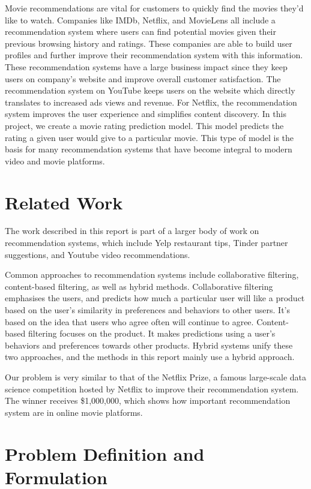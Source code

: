 \documentclass{sig-alternate-05-2015}
\begin{document}
Movie recommendations are vital for customers to quickly find the movies they'd like to watch. Companies
like IMDb, Netflix, and MovieLens all include a recommendation system where users can find potential
movies given their previous browsing history and ratings. These companies are able to build user
profiles and further improve their recommendation system with this information. These recommendation
systems have a large business impact since they keep users on company's website and improve overall
customer satisfaction. The recommendation system on YouTube keeps users on the website
which directly translates to increased ads views and revenue. For Netflix, the recommendation system
improves the user experience and simplifies content discovery. In this project, we create a movie rating prediction
model. This model predicts the rating a given user would give to a particular movie. This type of model is the basis
for many recommendation systems that have become integral to modern video and movie platforms.

\section{Related Work}

The work described in this report is part of a larger body of work on recommendation systems, which include Yelp
restaurant tips, Tinder partner suggestions, and Youtube video recommendations.

Common approaches to recommendation systems include collaborative filtering, content-based filtering,
as well as hybrid methods. Collaborative filtering emphasises the users, and predicts how much
a particular user will like a product based on the user's similarity in preferences and behaviors to
other users. It's based on the idea that users who agree often will continue to agree. Content-based
filtering focuses on the product. It makes predictions using a user's behaviors and preferences
towards other products. Hybrid systems unify these two approaches, and the methods in this report mainly
use a hybrid approach.

Our problem is very similar to that of the Netflix Prize, a famous large-scale data science competition
hosted by Netflix to improve their recommendation system. The winner receives \$1,000,000,
which shows how important recommendation system are in online movie platforms.

\section{Problem Definition and Formulation}
\end{document}
